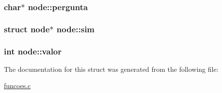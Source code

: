 \subsubsection[{\texorpdfstring{pergunta}{pergunta}}]{\setlength{\rightskip}{0pt plus 5cm}char$\ast$ node\+::pergunta}\hypertarget{structnode_a55a6556b4365a179d03ca038fad7530c}{}\label{structnode_a55a6556b4365a179d03ca038fad7530c}
\subsubsection[{\texorpdfstring{sim}{sim}}]{\setlength{\rightskip}{0pt plus 5cm}struct {\bf node}$\ast$ node\+::sim}\hypertarget{structnode_a7f67cb5c3c6ed869d7e9a204af095135}{}\label{structnode_a7f67cb5c3c6ed869d7e9a204af095135}
\subsubsection[{\texorpdfstring{valor}{valor}}]{\setlength{\rightskip}{0pt plus 5cm}int node\+::valor}\hypertarget{structnode_aae328428a1fb362e7e7aca4b3ad67470}{}\label{structnode_aae328428a1fb362e7e7aca4b3ad67470}


The documentation for this struct was generated from the following file\+:\begin{DoxyCompactItemize}
\item 
\hyperlink{funcoes_8c}{funcoes.\+c}\end{DoxyCompactItemize}
